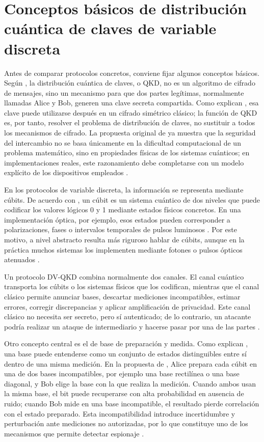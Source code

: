 \section{Conceptos básicos de distribución cuántica de claves de variable discreta}

Antes de comparar protocolos concretos, conviene fijar algunos conceptos básicos. Según \cite{gisin2002}, la distribución cuántica de claves, o QKD, no es un algoritmo de cifrado de mensajes, sino un mecanismo para que dos partes legítimas, normalmente llamadas Alice y Bob, generen una clave secreta compartida. Como explican \cite{lo2014}, esa clave puede utilizarse después en un cifrado simétrico clásico; la función de QKD es, por tanto, resolver el problema de distribución de claves, no sustituir a todos los mecanismos de cifrado. La propuesta original de \cite{bennett1984} ya muestra que la seguridad del intercambio no se basa únicamente en la dificultad computacional de un problema matemático, sino en propiedades físicas de los sistemas cuánticos; en implementaciones reales, este razonamiento debe completarse con un modelo explícito de los dispositivos empleados \citep{scarani2009,lo2014}.

En los protocolos de variable discreta, la información se representa mediante cúbits. De acuerdo con \cite{nielsen2010}, un cúbit es un sistema cuántico de dos niveles que puede codificar los valores lógicos 0 y 1 mediante estados físicos concretos. En una implementación óptica, por ejemplo, esos estados pueden corresponder a polarizaciones, fases o intervalos temporales de pulsos luminosos \citep{gisin2002,scarani2009}. Por este motivo, a nivel abstracto resulta más riguroso hablar de cúbits, aunque en la práctica muchos sistemas los implementen mediante fotones o pulsos ópticos atenuados \citep{gisin2002,lo2014}.

Un protocolo DV-QKD combina normalmente dos canales. El canal cuántico transporta los cúbits o los sistemas físicos que los codifican, mientras que el canal clásico permite anunciar bases, descartar mediciones incompatibles, estimar errores, corregir discrepancias y aplicar amplificación de privacidad. Este canal clásico no necesita ser secreto, pero sí autenticado; de lo contrario, un atacante podría realizar un ataque de intermediario y hacerse pasar por una de las partes \citep{bennett1984, gisin2002,scarani2009,lo2014}.

Otro concepto central es el de base de preparación y medida. Como explican \cite{nielsen2010}, una base puede entenderse como un conjunto de estados distinguibles entre sí dentro de una misma medición. En la propuesta de \cite{bennett1984}, Alice prepara cada cúbit en una de dos bases incompatibles, por ejemplo una base rectilínea o una base diagonal, y Bob elige la base con la que realiza la medición. Cuando ambos usan la misma base, el bit puede recuperarse con alta probabilidad en ausencia de ruido; cuando Bob mide en una base incompatible, el resultado pierde correlación con el estado preparado. Esta incompatibilidad introduce incertidumbre y perturbación ante mediciones no autorizadas, por lo que constituye uno de los mecanismos que permite detectar espionaje \citep{scarani2009}.


